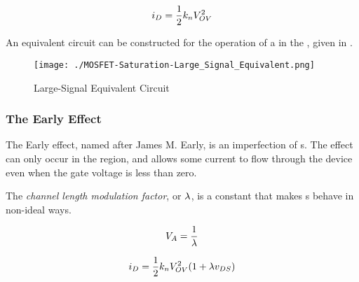 \begin{equation}\label{eq:MOSFET_Saturation_Region-Current}
  i_{D} = \frac{1}{2} k_{n} V_{OV}^{2}
\end{equation}

An equivalent circuit can be constructed for the operation of a  in the , given in .

\begin{figure}[h!tbp]
  \centering
  \texttt{[image: ./MOSFET-Saturation-Large\_Signal\_Equivalent.png]}
  \caption{Large-Signal  Equivalent Circuit \parencite[p.~268]{sedraTextbook7}}
  \label{fig:MOSFET-Large_Signal_Equivalent_Circuit}
\end{figure}

\subsubsection{The Early Effect}\label{subsubsec:MOSFET-Early_Effect}
The Early effect, named after James M. Early, is an imperfection of s.
The effect can only occur in the  region, and allows some current to flow through the device even when the gate voltage is less than zero.

\begin{definition}\label{def:MOSFET-Channel_Length_Modulation_Factor}
  The \emph{channel length modulation factor}, or $\lambda$, is a constant that makes s behave in non-ideal ways.
\end{definition}

\begin{equation}\label{eq:MOSFET-Early_Effect-VA}
  V_{A} = \frac{1}{\lambda}
\end{equation}

\begin{equation}\label{eq:MOSFET-Early_Effect-rd}
  i_{D} = \frac{1}{2} k_{n} V_{OV}^{2} (1 + \lambda v_{DS})
\end{equation}

